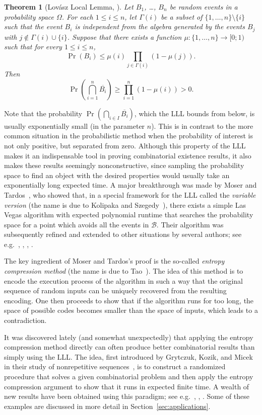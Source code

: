 \documentclass[10pt]{article}
\numberwithin{equation}{subsection}
\newtheorem{theo}{Theorem}[section]
\theoremstyle{definition}
\begin{document}
	\begin{theo}[Lov\'{a}sz Local Lemma, \cite{AS}]
		Let $B_1$, \ldots, $B_n$ be random events in a probability space $\Omega$. For each $1 \leq i \leq n$, let $\Gamma(i)$ be a subset of $\{1, \ldots, n\} \setminus \{i\}$ such that the event $B_i$ is independent from the algebra generated by the events $B_j$ with $j \not \in \Gamma(i) \cup \{i\}$. Suppose that there exists a function $\mu\colon \{1, \ldots, n\}\to[0;1)$ such that for every $1 \leq i \leq n$,
		$$
		\Pr(B_i)\leq \mu(i) \prod_{j \in \Gamma(i)}(1-\mu(j)).
		$$
		Then
		$$
		\Pr\left(\bigcap_{i =1}^n\overline{B_i}\right) \geq \prod_{i = 1}^n(1 - \mu(i)) > 0.
		$$
	\end{theo}
	
	Note that the probability $\Pr\left(\bigcap_{i \in I}\overline{B_i}\right)$, which the LLL bounds from below, is usually exponentially small (in the parameter $n$). This is in contrast to the more common situation in the probabilistic method when the probability of interest is not only positive, but separated from zero. Although this property of the LLL makes it an indispensable tool in proving combinatorial existence results, it also makes these results seemingly nonconstructive, since sampling the probability space to find an object with the desired properties would usually take an exponentially long expected time. A major breakthrough was made by Moser and Tardos~\cite{Moser}, who showed that, in a special framework for the LLL called the \emph{variable version} (the name is due to Kolipaka and Szegedy~\cite{Kolipaka1}), there exists a simple Las Vegas algorithm with expected polynomial runtime that searches the probability space for a point which avoids all the events in $\mathcal{B}$. Their algorithm was subsequently refined and extended to other situations by several authors; see e.g.~\cite{Pegden}, \cite{Kolipaka1}, \cite{ach}, \cite{CGH}.
	
	The key ingredient of Moser and Tardos's proof is the so-called \emph{entropy compression method} (the name is due to Tao~\cite{Tao}). The idea of this method is to encode the execution process of the algorithm in such a way that the original sequence of random inputs can be uniquely recovered from the resulting encoding. One then proceeds to show that if the algorithm runs for too long, the space of possible codes becomes smaller than the space of inputs, which leads to a contradiction.
	
	It was discovered lately (and somewhat unexpectedly) that applying the entropy compression method directly can often produce better combinatorial results than simply using the LLL. The idea, first introduced by Grytczuk, Kozik, and Micek in their study of nonrepetitive sequences~\cite{Grytczuk}, is to construct a randomized procedure that solves a given combinatorial problem and then apply the entropy compression argument to show that it runs in expected finite time. A wealth of new results have been obtained using this paradigm; see e.g.~\cite{Duj}, \cite{Esperet}, \cite{Goncalves}. Some of these examples are discussed in more detail in Section~\ref{sec:applications}.
	
\end{document}
